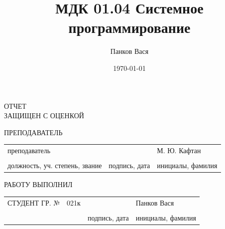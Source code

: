 \documentclass[14pt]{extarticle}
\author{Панков Вася}
\date{\today}
\title{МДК 01.04 Системное программирование}
\begin{document}
\begin{titlepage}


\vspace{32pt}


\vspace{60pt}

\raggedright{ОТЧЕТ \\
ЗАЩИЩЕН С ОЦЕНКОЙ}
\vspace{14pt}

\raggedright{ПРЕПОДАВАТЕЛЬ}

\vspace{12pt}

\begin{tabularx}{\textwidth}{ >{\centering\arraybackslash}X >{\centering\arraybackslash}X >{\centering\arraybackslash}X }
	 преподаватель & & М. Ю. Кафтан \\ 
	 \hrulefill & \hrulefill & \hrulefill \\ 
\footnotesize{должность, уч. степень, звание} & \footnotesize{подпись, дата} & \footnotesize{инициалы, фамилия} \\ 
\end{tabularx} 
 
\vspace{48pt} 


\vspace{76pt} 


\vspace*{\fill} 

\raggedright{РАБОТУ ВЫПОЛНИЛ} 

\vspace{10pt} 

\begin{tabularx}{\textwidth}{>{\raggedright\arraybackslash}X  >{\centering\arraybackslash}X >{\centering\arraybackslash}X >{\centering\arraybackslash}X }
	 СТУДЕНТ ГР. № & 021к & & Панков Вася \\ 
	 & \hrulefill & \hrulefill & \hrulefill \\ 
	 &  & \footnotesize{подпись, дата} & \footnotesize{инициалы, фамилия} \\ 
\end{tabularx} 
 
\vspace*{\fill} 


\end{titlepage}
\end{document}
